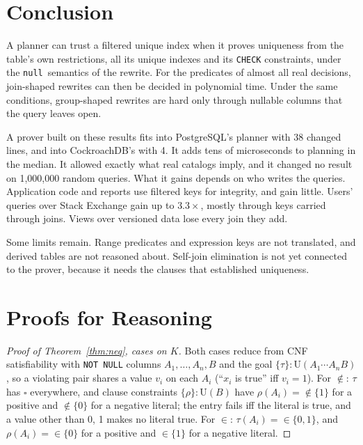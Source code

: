 \documentclass[conference]{IEEEtran}
\theoremstyle{definition}
\newcommand{\sql}[1]{\texttt{#1}}
\newcommand{\nul}{\texttt{null}}
\newcommand{\U}[1]{\mathrm{U}(#1)}
\newcommand{\any}{\square}
\newif\ifextended
\begin{document}
\section{Conclusion}\label{sec:conclusion}

A planner can trust a filtered unique index when it proves uniqueness from the table's own restrictions, all its
unique indexes and its \sql{CHECK} constraints, under the \nul\ semantics of the rewrite. For the predicates of almost all
real decisions, join-shaped rewrites can then be decided in polynomial time. Under the same conditions, group-shaped
rewrites are hard only through nullable columns that the query leaves open.

A prover built on these results fits into PostgreSQL's planner with 38 changed lines, and into CockroachDB's with 4. It
adds tens of microseconds to planning in the median. It allowed exactly what real catalogs imply, and it changed no
result on 1{,}000{,}000 random queries. What it gains depends on who writes the queries. Application code and reports use filtered
keys for integrity, and gain little. Users' queries over Stack Exchange gain up to $3.3\times$, mostly through keys
carried through joins. Views over versioned data lose every join they add.

Some limits remain. Range predicates and expression keys are not translated, and derived tables are not reasoned about.
Self-join elimination is not yet connected to the prover, because it needs the clauses that established uniqueness.


\ifextended
\appendices
\section{Proofs for Reasoning}\label{app:reason}

\begin{proof}[Proof of Theorem~\ref{thm:neq}, cases on $K$]
Both cases reduce from CNF satisfiability with \sql{NOT NULL} columns $A_1,\dots,A_n,B$ and the goal
$\{\tau\}:\U{A_1\cdots A_nB}$, so a violating pair shares a value $v_i$ on each $A_i$ (``$x_i$ is
true'' iff $v_i=1$). For ${\notin}$: $\tau$ has $\any$ everywhere, and clause constraints
$\{\rho\}:\U{B}$ have $\rho(A_i)={\notin}\{1\}$ for a positive and ${\notin}\{0\}$ for a negative
literal; the entry fails iff the literal is true, and a value other than 0, 1 makes no literal
true. For ${\in}$: $\tau(A_i)={\in}\{0,1\}$, and $\rho(A_i)={\in}\{0\}$ for a positive and
${\in}\{1\}$ for a negative literal.
\end{proof}
\end{document}
